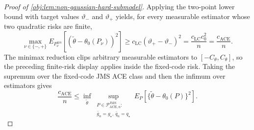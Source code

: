 \begin{proof}[Proof of \cref{obj:lem:non-gaussian-hard-submodel}]
Applying the two-point lower bound with target values \(\vartheta_-\) and \(\vartheta_+\) yields, for every measurable estimator whose two quadratic risks are finite,
\[
\max_{\nu\in\{-,+\}}
E_{P_\nu^{\otimes n}}\!\left[(\widetilde\theta-\theta_0(P_\nu))^2\right]
\ge
c_{\mathrm{LC}}(\vartheta_+-\vartheta_-)^2
=
\frac{c_{\mathrm{LC}}c_0^2}{n}
=
\frac{c_{\mathrm{ACE}}}{n}.
\]
The minimax reduction clips arbitrary measurable estimators to \([-C_{\theta},C_{\theta}]\), so the preceding finite-risk display applies inside the fixed-code risk.  Taking the supremum over the fixed-code JMS ACE class and then the infimum over estimators gives
\[
\frac{c_{\mathrm{ACE}}}{n}
\le
\inf_{\widetilde\theta}
\sup_{\substack{P\in\mathcal P_{\mathrm{ACE},n}^{\mathrm{JMS}}:\\
\bar g_n=g_\star,\ \bar q_n=q_\star}}
E_P\!\left[\{\widetilde\theta-\theta_0(P)\}^2\right].
\]
\end{proof}
